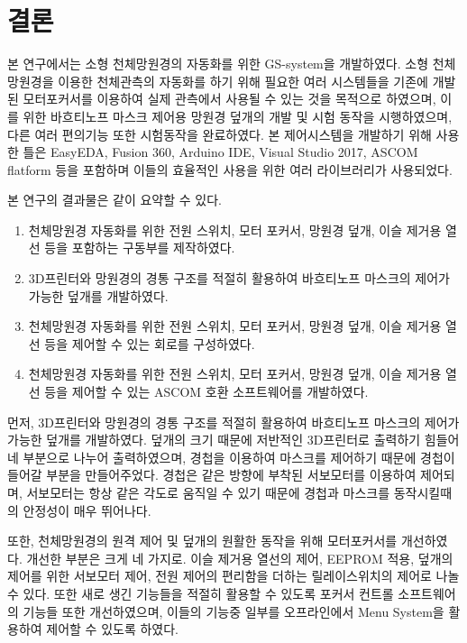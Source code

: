 \section{결론}
본 연구에서는 소형 천체망원경의 자동화를 위한 GS-system을 개발하였다. 
소형 천체망원경을 이용한 천체관측의 자동화를 하기 위해 필요한 여러 시스템들을 기존에 개발된 모터포커서를 이용하여 실제 관측에서 사용될 수 있는 것을 목적으로 하였으며, 이를 위한 바흐티노프 마스크 제어용 망원경 덮개의 개발 및 시험 동작을 시행하였으며, 다른 여러 편의기능 또한 시험동작을 완료하였다. 본 제어시스템을 개발하기 위해 사용한 틀은 EasyEDA, Fusion 360, Arduino IDE, Visual Studio 2017, ASCOM flatform 등을 포함하며 이들의 효율적인 사용을 위한 여러 라이브러리가 사용되었다.

본 연구의 결과물은 같이 요약할 수 있다. 

\begin{enumerate}
	
	\item 천체망원경 자동화를 위한 전원 스위치, 모터 포커서, 망원경 덮개, 이슬 제거용 열선 등을 포함하는 구동부를 제작하였다. 
	
		\item 3D프린터와 망원경의 경통 구조를 적절히 활용하여 바흐티노프 마스크의 제어가 가능한 덮개를 개발하였다.
	
	
	\item 천체망원경 자동화를 위한 전원 스위치, 모터 포커서, 망원경 덮개, 이슬 제거용 열선 등을 제어할 수 있는 회로를 구성하였다.
	
	\item 천체망원경 자동화를 위한 전원 스위치, 모터 포커서, 망원경 덮개, 이슬 제거용 열선 등을 제어할 수 있는 ASCOM 호환 소프트웨어를 개발하였다.
	
	
\end{enumerate}

먼저, 3D프린터와 망원경의 경통 구조를 적절히 활용하여 바흐티노프 마스크의 제어가 가능한 덮개를 개발하였다. 덮개의 크기 때문에 저반적인 3D프린터로 출력하기 힘들어 네 부분으로 나누어 출력하였으며, 경첩을 이용하여 마스크를 제어하기 때문에 경첩이 들어갈 부분을 만들어주었다. 경첩은 같은 방향에 부착된 서보모터를 이용하여 제어되며, 서보모터는 항상 같은 각도로 움직일 수 있기 때문에 경첩과 마스크를 동작시킬때의 안정성이 매우 뛰어나다.

또한, 천체망원경의 원격 제어 및 덮개의 원활한 동작을 위해 모터포커서를 개선하였다. 개선한 부분은 크게 네 가지로. 이슬 제거용 열선의 제어, EEPROM 적용, 덮개의 제어를 위한 서보모터 제어, 전원 제어의 편리함을 더하는 릴레이스위치의 제어로 나놀 수 있다. 또한 새로 생긴 기능들을 적절히 활용할 수 있도록 포커서 컨트롤 소프트웨어의 기능들 또한 개선하였으며, 이들의 기능중 일부를 오프라인에서 Menu System을 활용하여 제어할 수 있도록 하였다.

